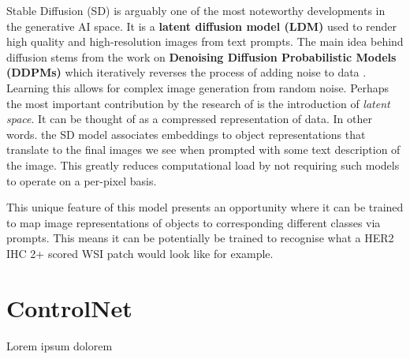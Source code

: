 Stable Diffusion (SD) is arguably one of the most noteworthy developments in the generative AI space. It is a  \textbf{latent diffusion model (LDM)} \parencite{Rombach2021High-ResolutionModels} used to render high quality and high-resolution images from text prompts. The main idea behind diffusion stems from the work on \textbf{Denoising Diffusion Probabilistic Models (DDPMs)} which iteratively reverses the process of adding noise to data \parencite{Ho2020DenoisingModels}. Learning this allows for complex image generation from random noise. Perhaps the most important contribution by the research of  \textcite{Rombach2021High-ResolutionModels} is the introduction of \textit{latent space}. It can be thought of as a compressed representation of data. In other words. the SD model associates embeddings to object representations that translate to the final images we see when prompted with some text description of the image. This greatly reduces computational load by not requiring such models to operate on a per-pixel basis.



This unique feature of this model presents an opportunity where it can be trained to map image representations of objects to corresponding different classes via prompts. This means it can be potentially be trained to recognise what a HER2 IHC 2+ scored WSI patch would look like for example. 

\section{ControlNet}

Lorem ipsum dolorem




